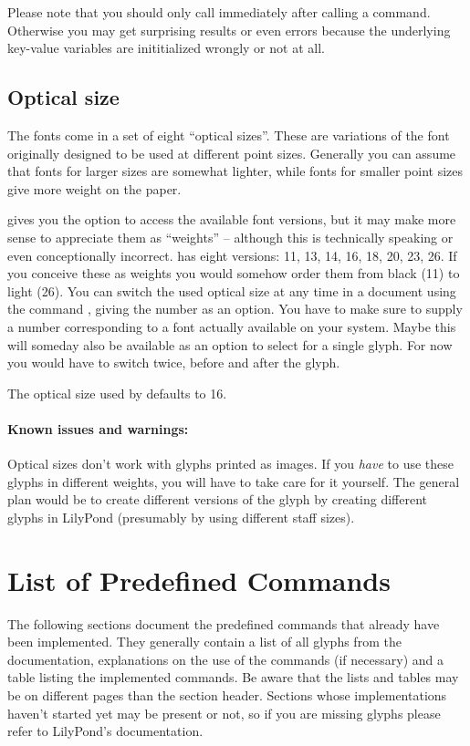 \documentclass{article}
\begin{document}
Please note that you should only call  immediately after calling a  command. Otherwise you may get surprising results or even errors because the underlying key-value variables are inititialized wrongly or not at all.

\subsection{Optical size}
\label{subsec:optical_size}
The \emmentaler fonts come in a set of eight \enquote{optical sizes}.
These are variations of the font originally designed to be used at different point sizes.
Generally you can assume that fonts for larger sizes are somewhat lighter, while fonts for smaller point sizes give more weight on the paper.

\lilyglyphs gives you the option to access the available font versions, but it may make more sense to appreciate them as \enquote{weights} -- although this is technically speaking or even conceptionally incorrect.
\emmentaler has eight versions: 11, 13, 14, 16, 18, 20, 23, 26. 
If you conceive these as weights you would somehow order them from black (11) to light (26).
You can switch the used optical size at any time in a document using the command , giving the number as an option. 
You have to make sure to supply a number corresponding to a font actually available on your system.
Maybe this will someday also be available as an option to select for a single glyph.
For now you would have to switch twice, before and after the glyph.

The optical size used by \lilyglyphs defaults to 16.

\paragraph*{Known issues and warnings:}
Optical sizes don't work with glyphs printed as images.
If you \emph{have} to use these glyphs in different weights, you will have to take care for it yourself.
The general plan would be to create different versions of the glyph by creating different glyphs in LilyPond (presumably by using different staff sizes).

\section{List of Predefined Commands}
\label{sec:list_predefined_commands}
The following sections document the predefined commands that already have been implemented.
They generally contain a list of all glyphs from the \emmentaler documentation, explanations on the use of the commands (if necessary) and a table listing the implemented commands.
Be aware that the lists and tables may be on different pages than the section header.
Sections whose implementations haven't started yet may be present or not, so if you are missing glyphs please refer to LilyPond's documentation.
\end{document}
